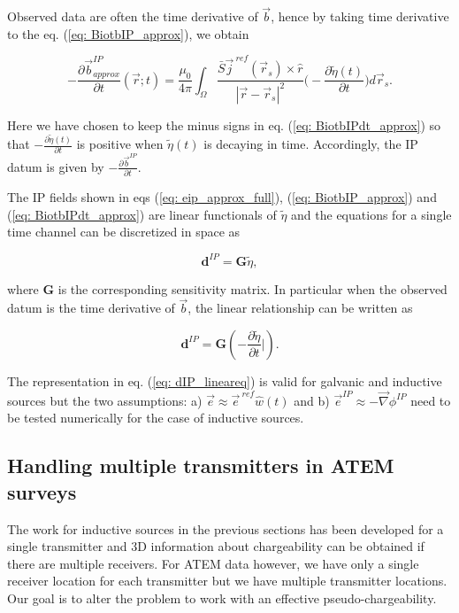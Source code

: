 \documentclass[letterpaper,11pt]{article}
\newcommand{\grad}{\vec \nabla}
\renewcommand {\j}  { {\vec j} }
\renewcommand {\b}  { {\vec b} }
\newcommand {\e}  { {\vec e} }
\newcommand{\peta}{\tilde{\eta}}
\newcommand{\eref}{\e^{\ ref}}
\newcommand{\jref}{\j^{\ ref}}
\begin{document}
Observed data are often the time derivative of $\b$, hence by taking time derivative to the eq. (\ref{eq: BiotbIP_approx}), we obtain
\begin{linenomath*}
\begin{equation}
  -\frac{\partial\b^{IP}_{approx}}{\partial t}(\vec{r}; t) = \frac{\mu_0}{4\pi} \int_{\Omega}  \frac{\bar{S}\jref(\vec{r}_s)\times\hat{r}}{|\vec{r}-\vec{r}_s|^2} \Big( -\frac{\partial \peta(t)}{\partial t} \Big) d\vec{r}_s.
  \label{eq: BiotbIPdt_approx}
\end{equation}
\end{linenomath*}
Here we have chosen to keep the minus signs in eq. (\ref{eq: BiotbIPdt_approx}) so that $-\frac{\partial \peta(t)}{\partial t}$ is positive when $\peta(t)$ is decaying in time. 
Accordingly, the IP datum is given by  $-\frac{\partial\b^{IP}}{\partial t}$. 

The IP fields shown in eqs (\ref{eq: eip_approx_full}), (\ref{eq: BiotbIP_approx}) and (\ref{eq: BiotbIPdt_approx}) are linear functionals of $\peta$ and the equations for a single time channel can be discretized in space as
\begin{linenomath*}
\begin{equation}
  \mathbf{d}^{IP} = \mathbf{G}\peta,
  \label{eq: dIP_lineareq}
\end{equation}
\end{linenomath*}
where $\mathbf{G}$ is the corresponding sensitivity matrix. 
In particular when the observed datum is the time derivative of $\b$, the linear relationship can be written as 
\begin{linenomath*}
\begin{equation}
  \mathbf{d}^{IP} = \mathbf{G}(-\frac{\partial \peta}{\partial t}\Big|).
  \label{eq: dIP_lineareq_dbdt}
\end{equation}
\end{linenomath*}
The representation in eq. (\ref{eq: dIP_lineareq}) is valid for galvanic and inductive sources but the two assumptions: a) $\e \approx \eref \hat{w}(t)$ and b) $\e^{IP} \approx -\grad\phi^{IP}$ need to be tested numerically for the case of inductive sources. 

\subsection{Handling multiple transmitters in ATEM surveys}
\label{subsection: Handling multiple transmitters in ATEM surveys}
The work for inductive sources in the previous sections has been developed for a single transmitter and 3D information about chargeability can be obtained if there are multiple receivers. For ATEM data however, we have only a single receiver location for each transmitter but we have multiple transmitter locations. 
Our goal is to alter the problem to work with an effective pseudo-chargeability. 
\end{document}

